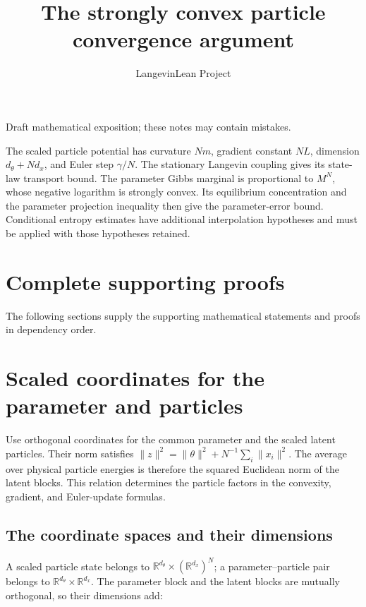 \documentclass[11pt,a4paper]{article}
\title{\texorpdfstring{The strongly convex particle convergence argument}{The strongly convex particle convergence argument}}
\author{LangevinLean Project}
\date{}
\begin{document}
\maketitle
Draft mathematical exposition; these notes may contain mistakes.


The scaled particle potential has curvature \(Nm\), gradient constant \(NL\), dimension \(d_\theta+Nd_x\), and Euler step \(\gamma/N\). The stationary Langevin coupling gives its state-law transport bound. The parameter Gibbs marginal is proportional to \(M^N\), whose negative logarithm is strongly convex. Its equilibrium concentration and the parameter projection inequality then give the parameter-error bound. Conditional entropy estimates have additional interpolation hypotheses and must be applied with those hypotheses retained.




\section*{Complete supporting proofs}
The following sections supply the supporting mathematical statements and proofs in dependency order.

\section{\texorpdfstring{Scaled coordinates for the parameter and particles}{Scaled coordinates for the parameter and particles}}


Use orthogonal coordinates for the common parameter and the scaled latent particles. Their norm satisfies \(\|z\|^2=\|\theta\|^2+N^{-1}\sum_i\|x_i\|^2\). The average over physical particle energies is therefore the squared Euclidean norm of the latent blocks. This relation determines the particle factors in the convexity, gradient, and Euler-update formulas.



\subsection{\texorpdfstring{The coordinate spaces and their dimensions}{The coordinate spaces and their dimensions}}


A scaled particle state belongs to \(\mathbb R^{d_\theta}\times(\mathbb R^{d_x})^N\); a parameter–particle pair belongs to \(\mathbb R^{d_\theta}\times\mathbb R^{d_x}\). The parameter block and the latent blocks are mutually orthogonal, so their dimensions add:
\end{document}
